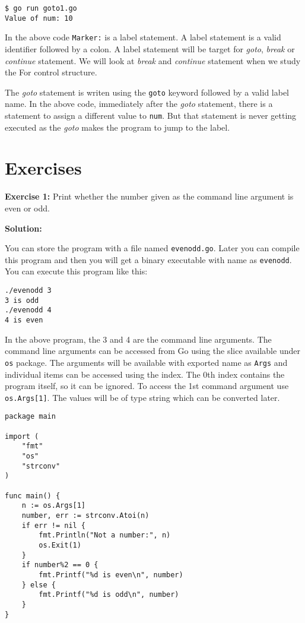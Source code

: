 \begin{lstlisting}[caption=Goto example program output]
$ go run goto1.go
Value of num: 10
\end{lstlisting}

In the above code \texttt{Marker:} is a label statement.  A label
statement is a valid identifier followed by a colon.  A label
statement will be target for \textit{goto}, \textit{break}
or \textit{continue} statement.  We will look at \textit{break}
and \textit{continue} statement when we study the For control
structure.

The \textit{goto} statement is writen using the \texttt{goto} keyword
followed by a valid label name.  In the above code, immediately after
the \textit{goto} statement, there is a statement to assign a
different value to \texttt{num}.  But that statement is never getting
executed as the \textit{goto} makes the program to jump to the label.

\section{Exercises}

\textbf{Exercise 1:} Print whether the number given as the command line
argument is even or odd.

\textbf{Solution:}

You can store the program with a file named \texttt{evenodd.go}.
Later you can compile this program and then you will get a binary
executable with name as \texttt{evenodd}.  You can execute this
program like this:

\begin{lstlisting}[numbers=none]
./evenodd 3
3 is odd
./evenodd 4
4 is even
\end{lstlisting}

In the above program, the 3 and 4 are the command line arguments.  The
command line arguments can be accessed from Go using the slice
available under \texttt{os} package.  The arguments will be available
with exported name as \texttt{Args} and individual items can be
accessed using the index.  The 0th index contains the program itself,
so it can be ignored.  To access the 1st command argument
use \texttt{os.Args[1]}.  The values will be of type string which can
be converted later.

\begin{lstlisting}[numbers=none]
package main

import (
    "fmt"
    "os"
    "strconv"
)

func main() {
    n := os.Args[1]
    number, err := strconv.Atoi(n)
    if err != nil {
        fmt.Println("Not a number:", n)
        os.Exit(1)
    }
    if number%2 == 0 {
        fmt.Printf("%d is even\n", number)
    } else {
        fmt.Printf("%d is odd\n", number)
    }
}
\end{lstlisting}


